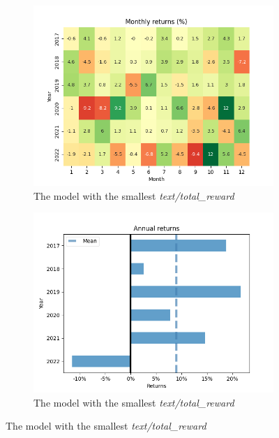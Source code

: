 \documentclass[../xlapes02]{subfiles}
\begin{document}
\begin{figure}[h!]
        \begin{subfigure}[t]{\experimentimgwidth\textwidth}
            \centering
            \includegraphics[width=\linewidth]{image/figure/monthly_returns_heatmap_min}
            \caption{The model with the smallest \emph{text/total\_reward}}
        \end{subfigure}
        \hfill
        \begin{subfigure}[t]{\experimentimgwidth\textwidth}
            \centering
            \includegraphics[width=\linewidth]{image/figure/annual_returns_min}
            \caption{The model with the smallest \emph{text/total\_reward}}
        \end{subfigure}


\end{figure}
\end{document}
